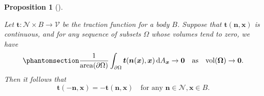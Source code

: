 \documentclass[
  letterpaper,
  DIV=11,
  numbers=noendperiod]{scrreprt}
\theoremstyle{plain}
\newtheorem{proposition}{Proposition}[chapter]
\theoremstyle{remark}
\begin{document}
\begin{proposition}[]\protect\hypertarget{prp-actionreaction}{}\label{prp-actionreaction}

Let \({\boldsymbol{t}}:{\mathcal{N}}\times B\to{\mathcal{V}}\) be the
traction function for a body \(B\). Suppose that
\({\boldsymbol{t}}({\boldsymbol{n}},{\boldsymbol{x}})\) is continuous,
and for any sequence of subsets \(\Omega\) whose volumes tend to zero,
we have \begin{equation}\phantomsection\label{eq-arcondition1}{
\frac{1}{{\operatorname{area}}(\partial\Omega)}\int_{\partial\Omega} {\boldsymbol{t}}({\boldsymbol{n}}({\boldsymbol{x}}),{\boldsymbol{x}}){\,{\mathrm{d}}A_{{\boldsymbol{x}}}}\to\bf0\quad\text{as}\quad{\operatorname{vol}}(\Omega)\to0.
}\end{equation} Then it follows that
\[{\boldsymbol{t}}(-{\boldsymbol{n}},{\boldsymbol{x}}) = -{\boldsymbol{t}}({\boldsymbol{n}},{\boldsymbol{x}})\quad\text{for any }{\boldsymbol{n}}\in{\mathcal{N}},{\boldsymbol{x}}\in B.\]

\end{proposition}
\end{document}
